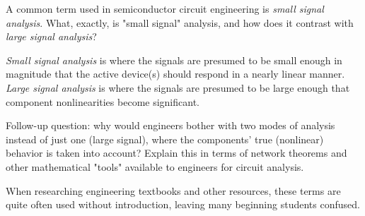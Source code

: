 

A common term used in semiconductor circuit engineering is {\it small signal analysis}.  What, exactly, is "small signal" analysis, and how does it contrast with {\it large signal analysis}?







{\it Small signal analysis} is where the signals are presumed to be small enough in magnitude that the active device(s) should respond in a nearly linear manner.  {\it Large signal analysis} is where the signals are presumed to be large enough that component nonlinearities become significant.

\vskip 10pt

Follow-up question: why would engineers bother with two modes of analysis instead of just one (large signal), where the components' true (nonlinear) behavior is taken into account?  Explain this in terms of network theorems and other mathematical "tools" available to engineers for circuit analysis.







When researching engineering textbooks and other resources, these terms are quite often used without introduction, leaving many beginning students confused.




